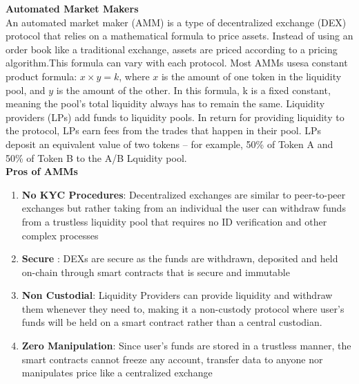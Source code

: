 \documentclass[letterpaper,11pt]{article}
\begin{document}
\textbf{Automated Market Makers}\\

An automated market maker (AMM) is a type of decentralized exchange (DEX) protocol that relies on a mathematical formula to price assets. Instead of using an order book like a traditional exchange, assets are priced according to a pricing algorithm.This formula can vary with each protocol. Most AMMs usesa constant product formula: $x  \times  y = k$, where $x$ is the amount of one token in the liquidity pool, and $y$ is the amount of the other. In this formula, k is a fixed constant, meaning the pool’s total liquidity always has to remain the same. Liquidity providers (LPs) add funds to liquidity pools. In return for providing liquidity to the protocol, LPs earn fees from the trades that happen in their pool. LPs deposit an equivalent value of two tokens – for example, 50\% of Token A and 50\% of Token B to the A/B Lquidity pool.\\

\textbf{Pros of AMMs}
\begin{enumerate}[wide, labelwidth=!, labelindent=0pt]
\item \textbf{No KYC Procedures}: Decentralized exchanges are similar to peer-to-peer exchanges but rather taking from an individual the user can withdraw funds from a trustless liquidity pool that requires no ID verification and other complex processes
\item \textbf{Secure} : DEXs are secure as the funds are withdrawn, deposited and held on-chain through smart contracts that is secure and immutable
\item \textbf{Non Custodial}: Liquidity Providers can provide liquidity and withdraw them whenever they need to, making it a non-custody protocol where user's funds will be held on a smart contract rather than a central custodian.
\item \textbf{Zero Manipulation}: Since user's funds are stored in a trustless manner, the smart contracts cannot freeze any account, transfer data to anyone nor manipulates price like a centralized exchange
\end{enumerate}
\end{document}
